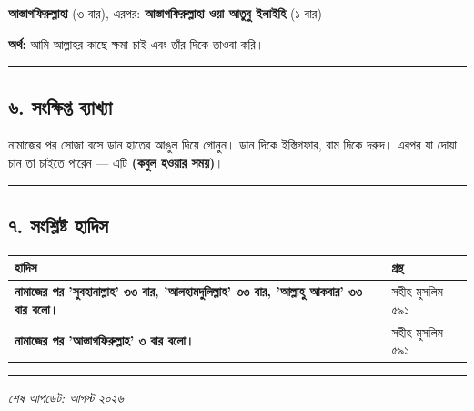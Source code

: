 \textbf{আস্তাগফিরুল্লাহা} (৩ বার), এরপর: \textbf{আস্তাগফিরুল্লাহা ওয়া আতুবু ইলাইহি} (১ বার)

\textbf{অর্থ:} আমি আল্লাহর কাছে ক্ষমা চাই এবং তাঁর দিকে তাওবা করি।

\medskip\hrule\medskip

\subsection*{৬. সংক্ষিপ্ত ব্যাখ্যা}

নামাজের পর সোজা বসে ডান হাতের আঙুল দিয়ে গোনুন। ডান দিকে ইস্তিগফার, বাম দিকে দরুদ। এরপর যা দোয়া চান তা চাইতে পারেন — এটি \textbf{  (কবুল হওয়ার সময়)}।

\medskip\hrule\medskip

\subsection*{৭. সংশ্লিষ্ট হাদিস}

\begin{table}[h]\centering\small
\begin{tabular}{ll}
হাদিস & গ্রন্থ \\
\hline
\textbf{\lat{“}নামাজের পর 'সুবহানাল্লাহ' ৩৩ বার, 'আলহামদুলিল্লাহ' ৩৩ বার, 'আল্লাহু আকবার' ৩৩ বার বলো।\lat{”}} & সহীহ মুসলিম ৫৯১ \\
\textbf{\lat{“}নামাজের পর 'আস্তাগফিরুল্লাহ' ৩ বার বলো।\lat{”}} & সহীহ মুসলিম ৫৯১ \\
\hline
\end{tabular}
\end{table}

\medskip\hrule\medskip

\textit{শেষ আপডেট: আগস্ট ২০২৬}



